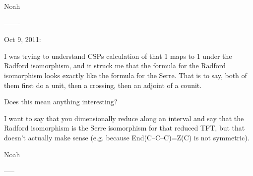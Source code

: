 Noah

-------

Oct 9, 2011:

I was trying to understand CSPs calculation of that 1 maps to 1 under the Radford isomorphism, and it struck me that the formula for the Radford isomorphism looks exactly like the formula for the Serre.  That is to say, both of them first do a unit, then a crossing, then an adjoint of a counit.

Does this mean anything interesting?  

I want to say that you dimensionally reduce along an interval and say that the Radford isomorphism is the Serre isomorphism for that reduced TFT, but that doesn't actually make sense (e.g. because End(C--C--C)=Z(C) is not symmetric).

Noah

-----


